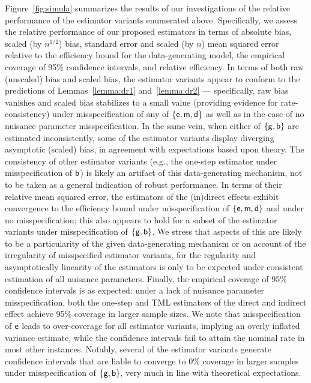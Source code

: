 Figure~\ref{fig:simula} summarizes the results of our investigations of the
relative performance of the estimator variants enumerated above. Specifically,
we assess the relative performance of our proposed estimators in terms of
absolute bias, scaled (by $n^{1/2}$) bias, standard error and scaled (by $n$)
mean squared error relative to the efficiency bound for the data-generating
model, the empirical coverage of 95\% confidence intervals, and relative
efficiency. In terms of both raw (unscaled) bias and scaled bias, the estimator
variants appear to conform to the predictions of Lemmas~\ref{lemma:dr1}
and~\ref{lemma:dr2} --- specifically, raw bias vanishes and scaled bias
stabilizes to a small value (providing evidence for rate-consistency) under
misspecification of any of $\{\mathsf{e}, \mathsf{m}, \mathsf{d}\}$ as well as in the case of no
nuisance parameter misspecification. In the same vein, when either of $\{\mathsf{g},
\mathsf{b}\}$ are estimated inconsistently, some of the estimator variants display
diverging asymptotic (scaled) bias, in agreement with expectations based upon
theory. The consistency of other estimator variants (e.g., the one-step
estimator under misspecification of $\mathsf{b}$) is likely an artifact of this
data-generating mechanism, not to be taken as a general indication of robust
performance. In terms of their relative mean squared error, the estimators of
the (in)direct effects exhibit convergence to the efficiency bound under
misspecification of $\{\mathsf{e}, \mathsf{m}, \mathsf{d}\}$ and under no misspecification; this also
appears to hold for a subset of the estimator variants under misspecification of
$\{\mathsf{g}, \mathsf{b}\}$. We stress that aspects of this are likely to be a particularity of
the given data-generating mechanism or on account of the irregularity of
misspecified estimator variants, for the regularity and asymptotically linearity
of the estimators is only to be expected under consistent estimation of all
nuisance parameters. Finally, the empirical coverage of 95\% confidence
intervals is as expected: under a lack of nuisance parameter misspecification,
both the one-step and TML estimators of the direct and indirect effect achieve
95\% coverage in larger sample sizes. We note that misspecification of $\mathsf{e}$
leads to over-coverage for all estimator variants, implying an overly inflated
variance estimate, while the confidence intervals fail to attain the nominal
rate in most other instances. Notably, several of the estimator variants
generate confidence intervals that are liable to converge to 0\% coverage in
larger samples under misspecification of $\{\mathsf{g}, \mathsf{b}\}$, very much in line with
theoretical expectations.
